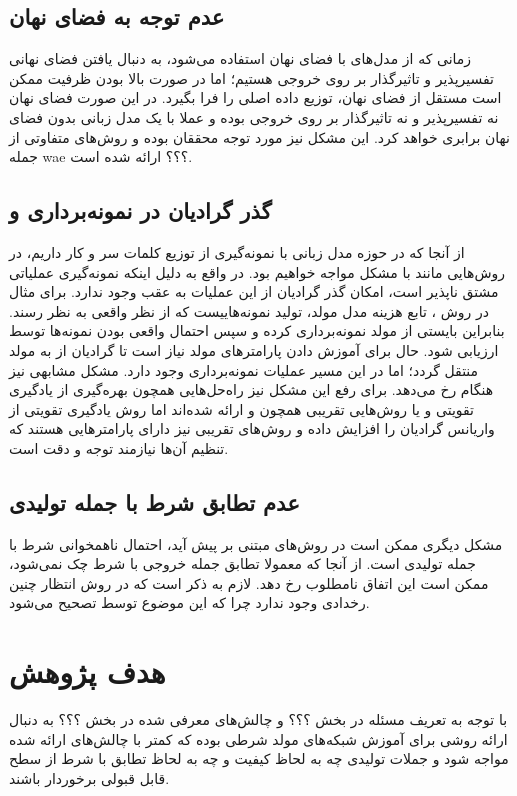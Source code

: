  \subsection{عدم توجه به فضای نهان}
 زمانی که از مدل‌های با فضای نهان استفاده می‌شود، به دنبال یافتن فضای نهانی تفسیرپذیر و تاثیرگذار بر روی خروجی \decoder{} هستیم؛ اما در صورت بالا بودن ظرفیت \decoder{} ممکن است مستقل از فضای نهان، توزیع داده اصلی را فرا بگیرد. در این صورت فضای نهان نه تفسیرپذیر و نه تاثیرگذار بر روی خروجی \decoder{} بوده و عملا با یک مدل زبانی بدون فضای نهان برابری خواهد کرد. این مشکل نیز مورد توجه محققان بوده و روش‌های متفاوتی از جمله wae ؟؟؟ ارائه شده است.
 \subsection{گذر گرادیان در نمونه‌برداری و
     }
از آنجا که در حوزه مدل زبانی با نمونه‌گیری از توزیع کلمات سر و کار داریم، در روش‌هایی مانند \gan{} با مشکل مواجه خواهیم بود. در واقع به دلیل اینکه نمونه‌گیری عملیاتی مشتق نا‌پذیر است، امکان گذر گرادیان از این عملیات به عقب وجود ندارد. برای مثال در روش \gan{}، تابع هزینه مدل مولد، تولید نمونه‌هاییست که از نظر \discriminator{} واقعی به نظر رسند. بنابراین بایستی از مولد نمونه‌برداری کرده و سپس احتمال واقعی بودن نمونه‌ها توسط \discriminator{} ارزیابی شود. حال برای آموزش دادن پارامتر‌های مولد نیاز است تا گرادیان از \discriminator{} به مولد منتقل گردد؛ اما در این مسیر عملیات نمونه‌برداری وجود دارد. مشکل مشابهی نیز هنگام \argmaxphrase{} رخ می‌دهد. برای رفع این مشکل نیز راه‌حل‌هایی همچون بهره‌گیری از یادگیری تقویتی و یا روش‌هایی تقریبی همچون  و  ارائه شده‌اند اما روش یادگیری تقویتی از واریانس گرادیان را افزایش داده و روش‌های تقریبی نیز دارای پارامتر‌هایی هستند که تنظیم آن‌ها نیازمند توجه و دقت است.
\subsection{عدم تطابق شرط با جمله تولیدی}
مشکل دیگری ممکن است در روش‌های مبتنی بر \likelihood{} پیش آید، احتمال ناهمخوانی شرط با جمله تولیدی است. از آنجا که معمولا تطابق جمله خروجی با شرط چک نمی‌شود، ممکن است این اتفاق نامطلوب رخ دهد. لازم به ذکر است که در روش \gan{} انتظار چنین رخدادی وجود ندارد چرا که این موضوع توسط \discriminator{} تصحیح می‌شود.
\section{هدف پژوهش}
با توجه به تعریف مسئله در بخش ؟؟؟ و چالش‌های معرفی شده در بخش ؟؟؟ به دنبال ارائه روشی برای آموزش شبکه‌های مولد شرطی بوده که کمتر با چالش‌های ارائه شده مواجه شود و جملات تولیدی چه به لحاظ کیفیت و چه به لحاظ تطابق با شرط از سطح قابل قبولی برخوردار باشند.

